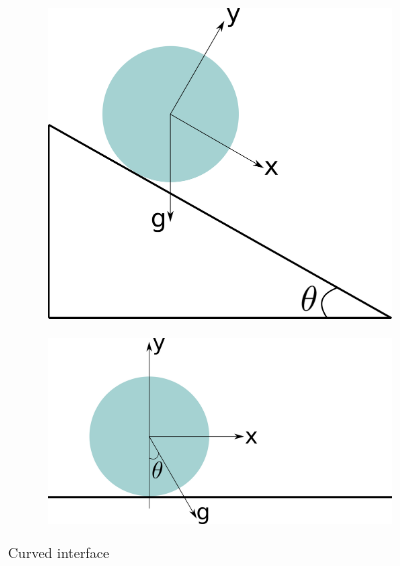 \documentclass[preprint,12pt]{elsarticle}
\begin{document}
\begin{figure}[!htpb]
  \centering
  \begin{subfigure}{0.48\textwidth}
    \centering
    \includegraphics[width=1.0\textwidth]{images/de_2021_cylinder_rolling_on_an_inclined_plane/schematic_1}
    \subcaption{}\label{fig:circular-body:schematic-1}
  \end{subfigure}
  \begin{subfigure}{0.48\textwidth}
    \centering
    \includegraphics[width=1.0\textwidth]{images/de_2021_cylinder_rolling_on_an_inclined_plane/schematic_2}
    \subcaption{}\label{fig:circular-body:schematic-2}
  \end{subfigure}
  \caption{Curved interface}
\label{fig:circular-body-schematic}
\end{figure}
\end{document}
